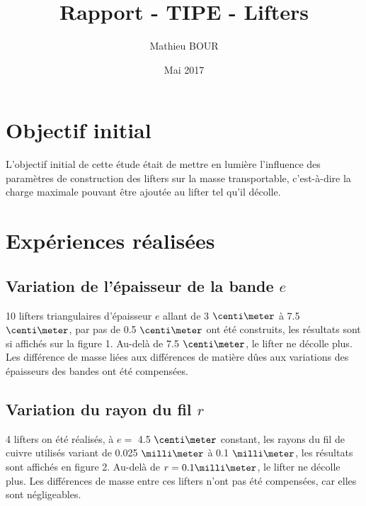 \documentclass[french]{article}
\title{Rapport - TIPE - Lifters}
\author{Mathieu BOUR}
\date{Mai 2017}
\begin{document}
	\maketitle
	
	\section{Objectif initial}
	L'objectif initial de cette étude était de mettre en lumière l'influence des paramètres de construction des lifters sur la masse transportable, c'est-à-dire la charge maximale pouvant être ajoutée au lifter tel qu'il décolle.
		
	\section{Expériences réalisées}
	\subsection{Variation de l'épaisseur de la bande $e$}
	10 lifters triangulaires d'épaisseur $e$ allant de 3 $\centi\meter$ à 7.5 $\centi\meter$, par pas de 0.5 $\centi\meter$ ont été construits, les résultats sont si affichés sur la figure 1. Au-delà de 7.5 $\centi\meter$, le lifter ne décolle plus. Les différence de masse liées aux différences de matière dûes aux variations des épaisseurs des bandes ont été compensées.
	
	\subsection{Variation du rayon du fil $r$}
	4 lifters on été réalisés, à $e = $ 4.5 $\centi\meter$ constant, les rayons du fil de cuivre utilisés variant de 0.025 $\milli\meter$ à 0.1 $\milli\meter$, les résultats sont affichés en figure 2. Au-delà de $r = 0.1 \milli\meter$, le lifter ne décolle plus. Les différences de masse entre ces lifters n'ont pas été compensées, car elles sont négligeables.
	
	\pagebreak
\end{document}
